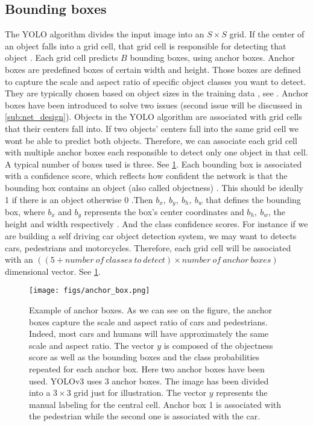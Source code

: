 \subsection{Bounding boxes}
The YOLO algorithm divides the input image into an $S \times S$ grid. If the center of an object falls into a grid cell, that grid cell is responsible
for detecting that object \cite{YOLOv1}. Each grid cell predicts $B$ bounding boxes, using anchor boxes. Anchor boxes are predefined boxes of certain width and height.
Those boxes are defined to capture the scale and aspect ratio of specific object classes you want to detect. They are typically chosen based on object
sizes in the training data \cite{MWAB}, see . Anchor boxes have been introduced to solve two issues (second issue will be discussed in \cref{sub:net_design}). Objects in the YOLO algorithm are associated with grid cells that their
centers fall into. If two objects' centers fall into the same grid cell we wont be able to predict both objects. Therefore, we can associate
each grid cell with multiple anchor boxes each responsible to detect only one object in that cell. A typical number of boxes used is three. See \cref{fig:yolo_output}.
Each bounding box is associated with a confidence score, which reflects how confident the network is that the bounding box contains an object (also called objectness) \cite{YOLOv1}.
This should be ideally 1 if there is an object otherwise 0 \cite{YOLOv3}.Then $b_{x},\ b_{y},\ b_{h},\ b_{w}$ that defines the bounding box, where $b_{x}$ and $b_{y}$ represents the box's
center coordinates and $b_{h},\ b_{w}$, the height and width respectively \cite{CERA}. And the class confidence scores. For instance if we are building a self driving car object detection system, we may want to detects cars, pedestrians and motorcycles. Therefore, each grid cell will be associated with
an $((5 + number\ of\ classes\ to\ detect) \times number\ of\ anchor\ boxes)$ dimensional vector. See \cref{fig:yolo_output}.

\begin{figure}[!htbp]
  \centering
  \texttt{[image: figs/anchor\_box.png]}
  \caption[Example of anchor boxes]{Example of anchor boxes. As we can see on the figure, the anchor boxes capture the scale and aspect ratio of cars and pedestrians. Indeed, most cars and humans will have approximately the same scale and aspect ratio. The vector $y$ is composed of the objectness score as well as the bounding boxes and the class probabilities repeated for each anchor box. Here two anchor boxes have been used. YOLOv3 uses 3 anchor boxes. The image has been divided into a $3 \times 3$ grid just for illustration. The vector $y$ represents the manual labeling for the central cell. Anchor box 1 is associated with the pedestrian while the second one is associated with the car.}\label{fig:yolo_output}
\end{figure}


